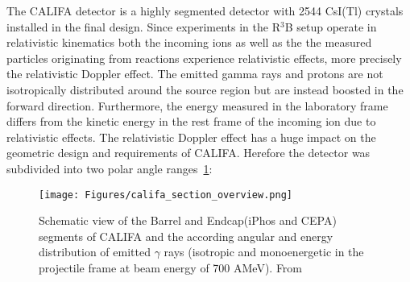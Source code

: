 The CALIFA detector is a highly segmented detector with 2544 CsI(Tl) crystals installed in the final design. Since experiments in the R$^3$B setup operate in relativistic kinematics both the incoming ions as well as the the measured particles originating from reactions experience relativistic effects, more precisely the relativistic Doppler effect. The emitted gamma rays and protons are not isotropically distributed around the source region but are instead boosted in the forward direction. Furthermore, the energy measured in the laboratory frame differs from the kinetic energy in the rest frame of the incoming ion due to relativistic effects.\newline
The relativistic Doppler effect has a huge impact on the geometric design and requirements of CALIFA. Herefore the detector was subdivided into two polar angle ranges~\ref{fig:califa_sec}:
\begin{figure}[htpb]
    \centering
    \texttt{[image: Figures/califa\_section\_overview.png]}
    \caption{
    Schematic view of the Barrel and Endcap(iPhos and CEPA) segments of CALIFA and the according angular and energy distribution of emitted $\gamma$ rays (isotropic and monoenergetic in the projectile frame at beam energy of 700 AMeV). From \cite{tdr:barrel}
    }
    \label{fig:califa_sec}
\end{figure}
